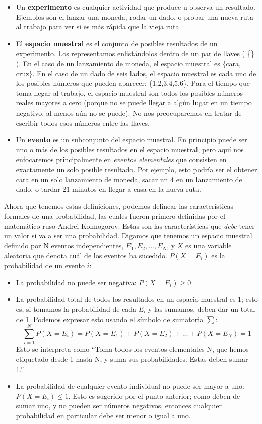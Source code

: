 \documentclass[
  12pt,
]{book}
\providecommand{\tightlist}{%
  \setlength{\itemsep}{0pt}\setlength{\parskip}{0pt}}
\begin{document}
\begin{itemize}
\tightlist
\item
  Un \textbf{experimento} es cualquier actividad que produce u observa un resultado. Ejemplos son el lanzar una moneda, rodar un dado, o probar una nueva ruta al trabajo para ver si es más rápida que la vieja ruta.
\item
  El \textbf{espacio muestral} es el conjunto de posibles resultados de un experimento. Los representamos enlistándolos dentro de un par de llaves ( \{\} ). En el caso de un lanzamiento de moneda, el espacio muestral es \{cara, cruz\}. En el caso de un dado de seis lados, el espacio muestral es cada uno de los posibles números que pueden aparecer: \{1,2,3,4,5,6\}. Para el tiempo que toma llegar al trabajo, el espacio muestral son todos los posibles números reales mayores a cero (porque no se puede llegar a algún lugar en un tiempo negativo, al menos aún no se puede). No nos preocuparemos en tratar de escribir todos esos números entre las llaves.
\item
  Un \textbf{evento} es un subconjunto del espacio muestral. En principio puede ser uno o más de los posibles resultados en el espacio muestral, pero aquí nos enfocaremos principalmente en \emph{eventos elementales} que consisten en exactamente un solo posible resultado. Por ejemplo, esto podría ser el obtener cara en un solo lanzamiento de moneda, sacar un 4 en un lanzamiento de dado, o tardar 21 minutos en llegar a casa en la nueva ruta.
\end{itemize}

Ahora que tenemos estas definiciones, podemos delinear las características formales de una probabilidad, las cuales fueron primero definidas por el matemático ruso Andrei Kolmogorov. Estas son las características que \emph{debe} tener un valor si va a ser una probabilidad. Digamos que tenemos un espacio muestral definido por N eventos independientes, \({E_1, E_2, ... , E_N}\), y \(X\) es una variable aleatoria que denota cuál de los eventos ha sucedido. \(P(X=E_i)\) es la probabilidad de un evento \(i\):

\begin{itemize}
\tightlist
\item
  La probabilidad no puede ser negativa: \(P(X=E_i) \ge 0\)
\item
  La probabilidad total de todos los resultados en un espacio muestral es 1; esto es, si tomamos la probabilidad de cada \(E_i\) y las sumamos, deben dar un total de 1. Podemos expresar esto usando el símbolo de sumatoria \(\sum\):
  \[
  \sum_{i=1}^N{P(X=E_i)} = P(X=E_1) + P(X=E_2) + ... + P(X=E_N) = 1
  \]
  Esto se interpreta como ``Toma todos los eventos elementales N, que hemos etiquetado desde 1 hasta N, y suma sus probabilidades. Estas deben sumar 1.''
\item
  La probabilidad de cualquier evento individual no puede ser mayor a uno: \(P(X=E_i)\le 1\). Esto es sugerido por el punto anterior; como deben de sumar uno, y no pueden ser números negativos, entonces cualquier probabilidad en particular debe ser menor o igual a uno.
\end{itemize}
\end{document}

